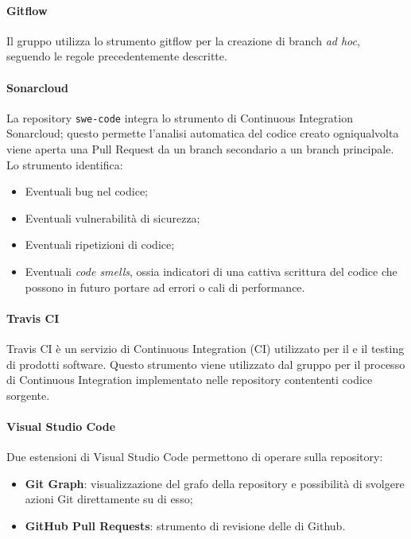 \documentclass[../norme-di-progetto.tex]{subfiles}
\begin{document}
\paragraph{Gitflow}
Il gruppo utilizza lo strumento gitflow per la creazione di branch \textit{ad hoc}, seguendo le regole precedentemente descritte.

\paragraph{Sonarcloud}
La repository \texttt{swe-code} integra lo strumento di Continuous Integration Sonarcloud; questo permette l'analisi automatica del codice creato ogniqualvolta viene aperta una Pull Request da un branch secondario a un branch principale. \\
Lo strumento identifica:
\begin{itemize}
  \item Eventuali bug nel codice;
  \item Eventuali vulnerabilità di sicurezza;
  \item Eventuali ripetizioni di codice;
  \item Eventuali \textit{code smells}, ossia indicatori di una cattiva scrittura del codice che possono in futuro portare ad errori o cali di performance.
\end{itemize}

\paragraph{Travis CI}
Travis CI è un servizio di Continuous Integration (CI) utilizzato per il  e il testing di prodotti software. Questo strumento viene utilizzato dal gruppo per il processo di Continuous Integration implementato nelle repository contententi codice sorgente.

\paragraph{Visual Studio Code}
Due estensioni di Visual Studio Code permettono di operare sulla repository:
\begin{itemize}
  \item \textbf{Git Graph}: visualizzazione del grafo della repository e possibilità di svolgere azioni Git direttamente su di esso;
  \item \textbf{GitHub Pull Requests}: strumento di revisione delle  di Github.
\end{itemize}
\end{document}
